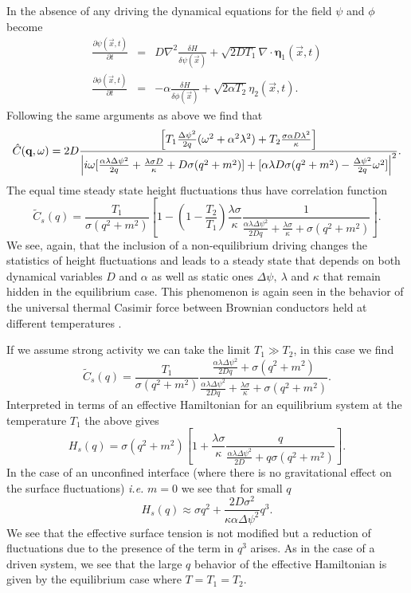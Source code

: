 In the absence of any driving the dynamical equations for the field $\psi$ and $\phi$ become 
\begin{eqnarray}
\frac{\partial \psi(\vec{x},t)}{\partial t} &=& D\nabla^2\frac{\delta H}{\delta \psi(\vec{x})}+ \sqrt{2D T_1}\nabla \cdot {\bm \eta}_1(\vec{x},t) \\
\frac{\partial \phi(\vec{x},t)}{\partial t} &=& -\alpha\frac{\delta H}{\delta \phi(\vec{x})}+ \sqrt{2\alpha T_2}{ \eta}_2(\vec{x},t).
\end{eqnarray}
Following the same arguments as above we find that
\begin{equation}
\hat C({\bf q},\omega)  = 2D \frac{\left[ T_1\frac{\Delta\psi^2}{2q}(\omega^2+\alpha^2 \lambda^2) + T_2\frac{\sigma\alpha D\lambda^2}{\kappa}\right]}{\left|i\omega[\frac{\alpha\lambda\Delta\psi^2}{2 q} +  \frac{\lambda \sigma D}{\kappa} + D\sigma(q^2+m^2)]
+[\alpha\lambda D\sigma(q^2+m^2) -\frac{\Delta\psi^2}{2q}\omega^2]\right|^2}.
\end{equation}
The equal time steady state height fluctuations thus have correlation function
\begin{equation}
\tilde C_s(q) = \frac{T_1}{\sigma (q^2 + m^2)}\left[ 1 -(1-\frac{T_2}{T_1})\frac{\lambda\sigma } {\kappa }\frac{1}{\frac{\alpha\lambda \Delta \psi^2}{2Dq}+ \frac{\lambda\sigma }{\kappa} + \sigma(q^2+m^2)}\right].
\end{equation}
We see, again, that the inclusion of a non-equilibrium driving changes the statistics of height fluctuations and leads to a steady state that depends on both dynamical variables
$D$ and $\alpha$ as well as static ones $\Delta\psi,\ \lambda$ and $\kappa$ that remain hidden in the equilibrium case. This phenomenon is again seen in the behavior of the universal thermal  Casimir force between Brownian conductors held at different temperatures \cite{lu2015}.

If we assume strong activity we can take the limit $T_1\gg T_2$, in this case we find
\begin{equation}
\tilde C_s(q) = \frac{T_1}{\sigma (q^2 + m^2)}\frac{\frac{\alpha\lambda \Delta \psi^2}{2Dq}+
\sigma(q^2+m^2)}{\frac{\alpha\lambda \Delta \psi^2}{2Dq}+ \frac{\lambda\sigma }{\kappa} + \sigma(q^2+m^2)}.
\end{equation}
Interpreted in terms of an effective Hamiltonian for an equilibrium system at the temperature $T_1$ the above gives
\begin{equation}
H_s(q) = \sigma (q^2 + m^2)\left[1+\frac{\lambda\sigma }{\kappa}\frac{q}{\frac{\alpha\lambda \Delta \psi^2}{2D}+
q\sigma(q^2+m^2)}\right].
\end{equation}
In the case of an unconfined interface (where there is no gravitational effect
on the surface fluctuations) {\em i.e.} $m=0$ we see that for small $q$
\begin{equation}
H_s(q) \approx \sigma q^2 +\frac{2D\sigma^2 }{\kappa\alpha \Delta\psi^2}q^3 .
\end{equation}
We see that the effective surface tension is not modified but a reduction of fluctuations due to the presence of the term in $q^3$ arises.  As in the case of a driven system, we see that the large $q$ behavior of the effective Hamiltonian is given by the equilibrium case where $T=T_1=T_2$. 

